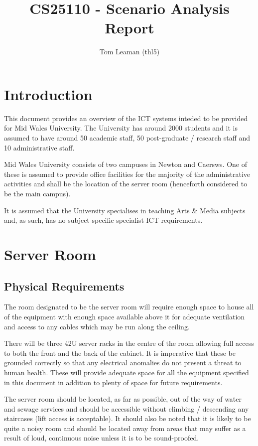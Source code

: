 \documentclass[a4paper, twoside]{article}
\title{CS25110 - Scenario Analysis Report}
\author{Tom Leaman (thl5)}
\begin{document}
\maketitle
\newpage
\tableofcontents
\newpage

\section{Introduction}
This document provides an overview of the ICT systems inteded to be provided for
Mid Wales University. The University has around 2000 students and it is assumed
to have around 50 academic staff, 50 post-graduate / research staff and 10
administrative staff.

Mid Wales University consists of two campuses in Newton and Caersws. One of
these is assumed to provide office facilities for the majority of the
administrative activities and shall be the location of the server room
(henceforth considered to be the main campus).

It is assumed that the University specialises in teaching Arts \& Media subjects
and, as such, has no subject-specific specialist ICT requirements.

\section{Server Room}
\subsection{Physical Requirements}
The room designated to be the server room will require enough space to house all
of the equipment with enough space available above it for adequate ventilation
and access to any cables which may be run along the ceiling.

There will be three 42U server racks in the centre of the room allowing full access
to both the front and the back of the cabinet. It is imperative that these be
grounded correctly so that any electrical anomalies do not present a threat to
human health. These will provide adequate space for all the equipment specified
in this document in addition to plenty of space for future requirements.

The server room should be located, as far as possible, out of the way of water
and sewage services and should be accessible without climbing / descending any
staircases (lift access is acceptable). It should also be noted that it is
likely to be quite a noisy room and should be located away from areas that may
suffer as a result of loud, continuous noise unless it is to be sound-proofed.
\end{document}
